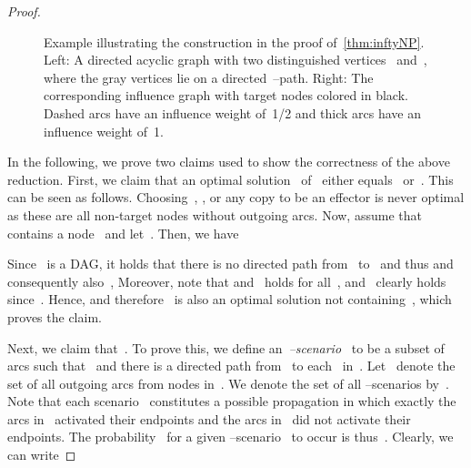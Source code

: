 \documentclass{article}
\begin{document}
\begin{proof}
\begin{figure}[t]
    \caption{Example illustrating the construction in the proof of~\autoref{thm:inftyNP}. 
      Left: A directed acyclic graph with two distinguished vertices~ and~, where the gray vertices lie on a directed~--path.
      Right: The corresponding influence graph with target nodes colored in black.
      Dashed arcs have an influence weight of~1/2 and thick arcs have an influence weight of~1.
    }
    \label{fig:inftyNP}
  \end{figure}
  
  In the following, we prove two claims used to show the correctness
  of the above reduction.
  First, we claim that an optimal solution~ of~ either
  equals~ or~.
  This can be seen as follows.
  Choosing~, , or any copy  to be an effector is never optimal
  as these are all non-target nodes without outgoing arcs.
  Now, assume that~ contains a node~ and let~.
  Then, we have
  
  Since~ is a DAG, it holds that there is no directed path from~ to~ and thus
   and consequently also~,
  Moreover, note that  and~ holds for all~,
  and~ clearly holds since~.
  Hence,  and
  therefore~ is also an optimal solution not containing~,
  which proves the claim.

  Next, we claim that~.
  To prove this, we define an~\emph{--scenario}~ to be a subset of arcs such that~ and there
  is a directed path from~ to each~ in~.
  Let~
  denote the set of all outgoing arcs from nodes in~.
  We denote the set of all --scenarios by~.
  Note that each scenario~ constitutes a possible propagation
  in which exactly the arcs in~ activated their endpoints and
  the arcs in~ did not activate their endpoints.
  The probability~ for a given --scenario~ to occur is
  thus~.
  Clearly, we can write
  


\end{proof}
\end{document}
